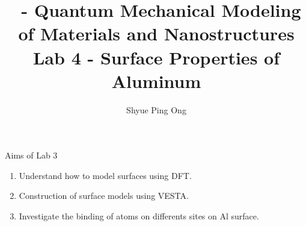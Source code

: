 \documentclass[aspectratio=169]{beamer}
\title[\classname Lab 4 - Surface Properties of Aluminum]{\classname~- Quantum Mechanical Modeling of Materials and Nanostructures\\Lab 4 - Surface Properties of Aluminum}
\author{Shyue Ping Ong}
\institute[UCSD]{University of California, San Diego\\
\medskip
}
\date{\classyear} %
\begin{document}
    \begin{frame}
        \titlepage %
    \end{frame}


    \begin{frame}{Aims of Lab 3}
        \Large{
            \begin{enumerate}
                \item Understand how to model surfaces using DFT.
                \item Construction of surface models using VESTA.
                \item Investigate the binding of atoms on differents sites on Al surface.
            \end{enumerate}
        }
    \end{frame}
\end{document}
